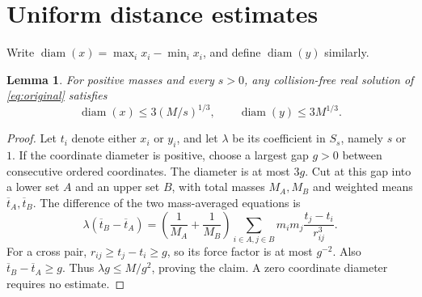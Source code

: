 \documentclass[11pt,a4paper]{amsart}
\newtheorem{lemma}[theorem]{Lemma}
\numberwithin{equation}{section}
\DeclareMathOperator{\diam}{diam}
\begin{document}
\section{Uniform distance estimates}\label{sec:estimates}

Write $\diam(x)=\max_i x_i-\min_i x_i$, and define $\diam(y)$ similarly.

\begin{lemma}\label{lem:diameter}
For positive masses and every $s>0$, any collision-free real solution
of \eqref{eq:original} satisfies
\begin{equation}\label{eq:diameter}
 \diam(x)\le3(M/s)^{1/3},\qquad \diam(y)\le3M^{1/3}.
\end{equation}
\end{lemma}
\begin{proof}
Let $t_i$ denote either $x_i$ or $y_i$, and let $\lambda$ be its
coefficient in $S_s$, namely $s$ or $1$. If the coordinate diameter is
positive, choose a largest gap $g>0$ between consecutive ordered
coordinates. The diameter is at most $3g$. Cut at this gap into a lower
set $A$ and an upper set $B$, with total masses $M_A,M_B$ and weighted
means $\overline t_A,\overline t_B$. The difference of the two
mass-averaged equations is
\[
 \lambda(\overline t_B-\overline t_A)
 =\left(\frac1{M_A}+\frac1{M_B}\right)
   \sum_{i\in A,j\in B}m_im_j\frac{t_j-t_i}{r_{ij}^3}.
\]
For a cross pair, $r_{ij}\ge t_j-t_i\ge g$, so its force factor is
at most $g^{-2}$. Also $\overline t_B-\overline t_A\ge g$.
Thus $\lambda g\le M/g^2$, proving the claim. A zero coordinate
diameter requires no estimate.
\end{proof}
\end{document}
